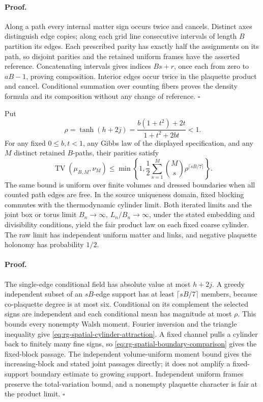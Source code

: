 \paragraph{Proof.}
Along a path every internal matter sign occurs twice and cancels. Distinct
axes distinguish edge copies; along each grid line consecutive intervals of
length \(B\) partition its edges. Each prescribed parity has exactly half the
assignments on its path, so disjoint parities and the retained uniform frames
have the asserted reference. Concatenating intervals gives indices
\(Bs+r\), once each from zero to \(aB-1\), proving composition. Interior
edges occur twice in the plaquette product and cancel. Conditional summation
over counting fibers proves the density formula and its composition without
any change of reference. \hfill\(\square\)

Put
\begin{equation}
 \rho=\tanh(h+2j)=\frac{b(1+t^2)+2t}{1+t^2+2bt}<1.
 \label{eq:rg-spatial-rho}
\end{equation}
For any fixed \(0\le b,t<1\), any Gibbs law of the displayed specification,
and any \(M\) distinct retained \(B\)-paths, their parities satisfy
\begin{equation}
 \operatorname{TV}(\mu_{B,M},\nu_M)
 \le\min\left\{1,\frac12\sum_{s=1}^M {M\choose s}
              \rho^{\lceil sB/7\rceil}\right\}.
 \label{eq:rg-spatial-cylinder-attraction}
\end{equation}
The same bound is uniform over finite volumes and dressed boundaries when all
counted path edges are free. In the source uniqueness domain, fixed blocking
commutes with the thermodynamic cylinder limit. Both iterated limits and the
joint box or torus limit \(B_n\to\infty\), \(L_n/B_n\to\infty\), under the
stated embedding and divisibility conditions, yield the fair product law on
each fixed coarse cylinder. The raw limit has independent uniform matter and
links, and negative plaquette holonomy has probability \(1/2\).

\paragraph{Proof.}
The single-edge conditional field has absolute value at most \(h+2j\).
A greedy independent subset of an \(sB\)-edge support has at least
\(\lceil sB/7\rceil\) members, because co-plaquette degree is at most six.
Conditional on its complement the selected signs are independent and each
conditional mean has magnitude at most \(\rho\). This bounds every nonempty
Walsh moment. Fourier inversion and the triangle inequality give
\cref{eq:rg-spatial-cylinder-attraction}. A fixed channel pulls a cylinder
back to finitely many fine signs, so \cref{eq:rg-spatial-boundary-comparison}
gives the fixed-block passage. The independent volume-uniform moment bound
gives the increasing-block and stated joint passages directly; it does not
amplify a fixed-support boundary estimate to growing support. Independent
uniform frames preserve the total-variation bound, and a nonempty plaquette
character is fair at the product limit. \hfill\(\square\)


